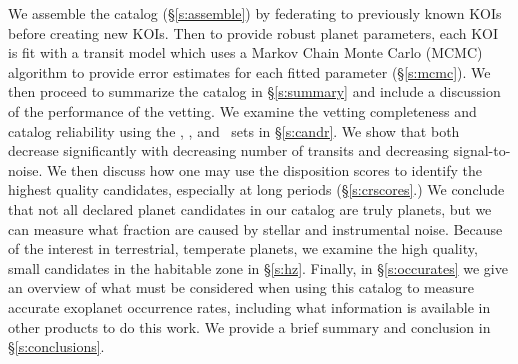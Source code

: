We assemble the catalog (\S\ref{s:assemble}) by federating to previously known KOIs before creating new KOIs. Then to provide robust planet parameters, each KOI is fit with a transit model which uses a Markov Chain Monte Carlo (MCMC) algorithm to provide error estimates for each fitted parameter (\S\ref{s:mcmc}). We then proceed to summarize the catalog in \S\ref{s:summary} and include a discussion of the performance of the vetting. We examine the vetting completeness and catalog reliability using the \injtce, \invtce, and \scrtce\ sets in \S\ref{s:candr}. We show that both decrease significantly with decreasing number of transits and decreasing signal-to-noise.  We then discuss how one may use the disposition scores to identify the highest quality candidates, especially at long periods (\S\ref{s:crscores}.)  We conclude that not all declared planet candidates in our catalog are truly planets, but we can measure what fraction are caused by stellar and instrumental noise. Because of the interest in terrestrial, temperate planets, we examine the high quality, small candidates in the habitable zone in \S\ref{s:hz}. Finally, in \S\ref{s:occurates} we give an overview of what must be considered when using this catalog to measure accurate exoplanet occurrence rates, including what information is available in other \Kepler{} products to do this work.  We provide a brief summary and conclusion in \S\ref{s:conclusions}.



